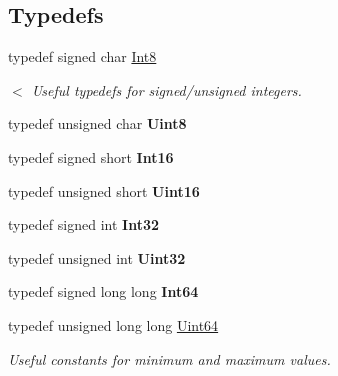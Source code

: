 \subsection*{Typedefs}
\begin{DoxyCompactItemize}
\item 
\hypertarget{namespacesteer_ac624bd4d8a4c5c8cec38cb037962696c}{typedef signed char \hyperlink{namespacesteer_ac624bd4d8a4c5c8cec38cb037962696c}{Int8}}\label{namespacesteer_ac624bd4d8a4c5c8cec38cb037962696c}

\begin{DoxyCompactList}\small\item\em $<$ Useful typedefs for signed/unsigned integers. \end{DoxyCompactList}\item 
\hypertarget{namespacesteer_a15b608712afd89174dd4bbb50c35ab70}{typedef unsigned char {\bfseries Uint8}}\label{namespacesteer_a15b608712afd89174dd4bbb50c35ab70}

\item 
\hypertarget{namespacesteer_a32f62ea8587b74f423b3112a633a3c8f}{typedef signed short {\bfseries Int16}}\label{namespacesteer_a32f62ea8587b74f423b3112a633a3c8f}

\item 
\hypertarget{namespacesteer_a203b74e59ae2cd122624a0f8fdd0ac69}{typedef unsigned short {\bfseries Uint16}}\label{namespacesteer_a203b74e59ae2cd122624a0f8fdd0ac69}

\item 
\hypertarget{namespacesteer_a1e0f7ba830c800fa6d940c46b8b1aa36}{typedef signed int {\bfseries Int32}}\label{namespacesteer_a1e0f7ba830c800fa6d940c46b8b1aa36}

\item 
\hypertarget{namespacesteer_aaf5daf8c35e087eb70c1d5378f62617f}{typedef unsigned int {\bfseries Uint32}}\label{namespacesteer_aaf5daf8c35e087eb70c1d5378f62617f}

\item 
\hypertarget{namespacesteer_a09ece6b46d4f0fbc8d22248cdf350c00}{typedef signed long long {\bfseries Int64}}\label{namespacesteer_a09ece6b46d4f0fbc8d22248cdf350c00}

\item 
\hypertarget{namespacesteer_a3d3437f640c793384ae68c4b453a6f21}{typedef unsigned long long \hyperlink{namespacesteer_a3d3437f640c793384ae68c4b453a6f21}{Uint64}}\label{namespacesteer_a3d3437f640c793384ae68c4b453a6f21}

\begin{DoxyCompactList}\small\item\em Useful constants for minimum and maximum values. \end{DoxyCompactList}\end{DoxyCompactItemize}
